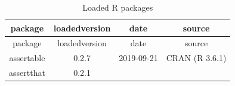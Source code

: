 \documentclass[11pt,]{book}
\begin{document}
\begin{longtable}[]{@{}cccc@{}}
\caption{\label{tab:sessioninfo}Loaded R packages}\tabularnewline
\toprule
\begin{minipage}[b]{0.18\columnwidth}\centering\strut
package\strut
\end{minipage} & \begin{minipage}[b]{0.19\columnwidth}\centering\strut
loadedversion\strut
\end{minipage} & \begin{minipage}[b]{0.16\columnwidth}\centering\strut
date\strut
\end{minipage} & \begin{minipage}[b]{0.36\columnwidth}\centering\strut
source\strut
\end{minipage}\tabularnewline
\midrule
\endfirsthead
\toprule
\begin{minipage}[b]{0.18\columnwidth}\centering\strut
package\strut
\end{minipage} & \begin{minipage}[b]{0.19\columnwidth}\centering\strut
loadedversion\strut
\end{minipage} & \begin{minipage}[b]{0.16\columnwidth}\centering\strut
date\strut
\end{minipage} & \begin{minipage}[b]{0.36\columnwidth}\centering\strut
source\strut
\end{minipage}\tabularnewline
\midrule
\endhead
\begin{minipage}[t]{0.18\columnwidth}\centering\strut
assertable\strut
\end{minipage} & \begin{minipage}[t]{0.19\columnwidth}\centering\strut
0.2.7\strut
\end{minipage} & \begin{minipage}[t]{0.16\columnwidth}\centering\strut
2019-09-21\strut
\end{minipage} & \begin{minipage}[t]{0.36\columnwidth}\centering\strut
CRAN (R 3.6.1)\strut
\end{minipage}\tabularnewline
\begin{minipage}[t]{0.18\columnwidth}\centering\strut
assertthat\strut
\end{minipage} & \begin{minipage}[t]{0.19\columnwidth}\centering\strut
0.2.1\strut
\end{minipage} & \begin{minipage}[t]{0.16\columnwidth}\centering\strut

\end{minipage}
\end{longtable}
\end{document}
